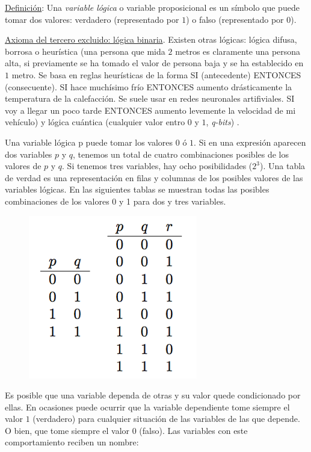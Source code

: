 \underline{Definición}:  Una \emph{variable lógica} o variable proposicional es un símbolo que puede tomar dos valores: verdadero (representado por $1$) o falso (representado por $0$).


\small{\underline{Axioma del tercero excluido: lógica binaria}. Existen otras lógicas: lógica difusa, borrosa o heurística (una persona que mida $2$ metros es claramente una persona alta, si previamente se ha tomado el valor de persona baja y se ha establecido en $1$ metro. Se basa en reglas heurísticas de la forma SI (antecedente) ENTONCES (consecuente). SI hace muchísimo frío ENTONCES aumento drásticamente la temperatura de la calefacción. Se suele usar en redes neuronales artifiviales. SI voy a llegar un poco tarde ENTONCES aumento levemente la velocidad de mi vehículo) y lógica cuántica (cualquier valor entro $0$ y $1$, \emph{q-bits})} \normalsize{.} 

\begin{multicols}{2}
Una variable lógica p puede tomar los valores $0$ ó $1$. Si en una expresión aparecen dos variables $p$ y $q$, tenemos un total de cuatro combinaciones posibles de los valores de $p$ y $q$. Si tenemos tres variables, hay ocho posibilidades ($2^3$). Una tabla de verdad es una representación en filas y columnas de los posibles valores de las variables lógicas. En las siguientes tablas se muestran todas las posibles combinaciones de los valores 0 y 1 para dos y tres variables.
\begin{figure}[H] 
		\centering
		\includegraphics[width=0.4
		\textwidth]{imagenes/apendices/APENDICESIM12.png}
	\end{figure}
\end{multicols}

Es posible que una variable dependa de otras y su valor quede condicionado por ellas. En ocasiones puede ocurrir que la variable dependiente tome siempre el valor $1$ (verdadero) para cualquier situación de las variables de las que depende. O bien, que tome siempre el valor $0$ (falso). Las variables con este comportamiento reciben un nombre:

